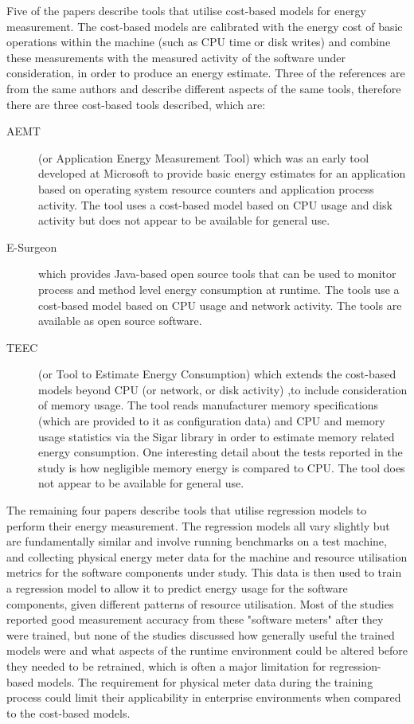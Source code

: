 Five of the papers describe tools that utilise cost-based models for energy measurement.  The cost-based models are calibrated with the energy cost of basic operations within the machine (such as CPU time or disk writes) and combine these measurements with the measured activity of the software under consideration, in order to produce an energy estimate.  Three of the references are from the same authors and describe different aspects of the same tools, therefore there are three cost-based tools described, which are:
\begin{description}
	\item[AEMT] (or Application Energy Measurement Tool) which was an early tool developed at Microsoft to provide basic energy estimates for an application based on operating system resource counters and application process activity.  The tool uses a cost-based model based on CPU usage and disk activity but does not appear to be available for general use.  \cite{kansal2008-energyprofiling}
	\item[E-Surgeon] which provides Java-based open source tools that can be used to monitor process and method level energy consumption at runtime.  The tools use a cost-based model based on CPU usage and network activity. The tools are available as open source software. \cite{noureddine2012-hotspots, noureddine2014-energyutest, noureddine2015-hotspots, noureddine2016-jolinar}
	\item[TEEC] (or Tool to Estimate Energy Consumption) which extends the cost-based models beyond CPU (or network, or disk activity) ,to include consideration of memory usage. The tool reads manufacturer memory specifications (which are provided to it as configuration data) and CPU and memory usage statistics via the Sigar library in order to estimate memory related energy consumption. One interesting detail about the tests reported in the study is how negligible memory energy is compared to CPU.  The tool does not appear to be available for general use. \cite{acar2016-beyondcpu}
\end{description}

The remaining four papers describe tools that utilise regression models to perform their energy measurement.  The regression models all vary slightly but are fundamentally similar and involve running benchmarks on a test machine, and collecting physical energy meter data for the machine and resource utilisation metrics for the software components under study.  This data is then used to train a regression model to allow it to predict energy usage for the software components, given different patterns of resource utilisation.  Most of the studies reported good measurement accuracy from these "software meters" after they were trained, but none of the studies discussed how generally useful the trained models were and what aspects of the runtime environment could be altered before they needed to be retrained, which is often a major limitation for regression-based models.  The requirement for physical meter data during the training process could limit their applicability in enterprise environments when compared to the cost-based models.

